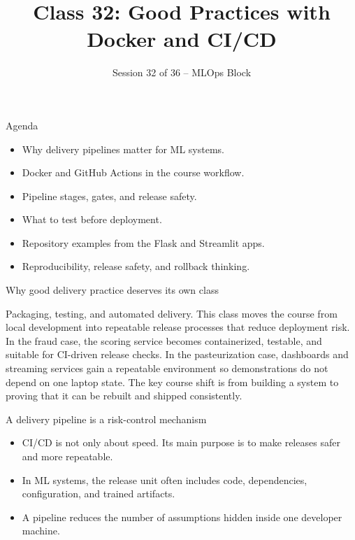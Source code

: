 

\title{Class 32: Good Practices with Docker and CI/CD}
\subtitle{Session 32 of 36 -- MLOps Block}
\author{\coursename}
\date{}



\frame{\titlepage \coursefooter}

\begin{frame}{Agenda}
\begin{itemize}
\item Why delivery pipelines matter for ML systems.
\item Docker and GitHub Actions in the course workflow.
\item Pipeline stages, gates, and release safety.
\item What to test before deployment.
\item Repository examples from the Flask and Streamlit apps.
\item Reproducibility, release safety, and rollback thinking.
\end{itemize}
\coursefooter
\end{frame}

\begin{frame}{Why good delivery practice deserves its own class}
\coursefooter
\end{frame}

\coursecontextframe
{Packaging, testing, and automated delivery.}
{This class moves the course from local development into repeatable release processes that reduce deployment risk.}
{In the fraud case, the scoring service becomes containerized, testable, and suitable for CI-driven release checks.}
{In the pasteurization case, dashboards and streaming services gain a repeatable environment so demonstrations do not depend on one laptop state.}
{The key course shift is from building a system to proving that it can be rebuilt and shipped consistently.}

\begin{frame}{A delivery pipeline is a risk-control mechanism}
\begin{itemize}
\item CI/CD is not only about speed. Its main purpose is to make releases safer and more repeatable.
\item In ML systems, the release unit often includes code, dependencies, configuration, and trained artifacts.
\item A pipeline reduces the number of assumptions hidden inside one developer machine.
\end{itemize}
\coursefooter
\end{frame}

